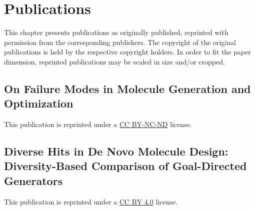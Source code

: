 \def\skippdf{1}

\chapter{Publications\label{chap:publications}}
This chapter presents publications as originally published, reprinted with permission
from the corresponding publishers. The copyright of the original publications is held
by the respective copyright holders. In order to fit the paper dimension, reprinted
publications may be scaled in size and/or cropped.

\clearpage
\thispagestyle{plain}
\section{On Failure Modes in Molecule Generation and Optimization\label{sec:failure-modes}}
This publication is reprinted under a \href{https://creativecommons.org/licenses/by-nc-nd/4.0/}{CC BY-NC-ND} license. 
\ifx\skippdf\undefined
    
    
\fi


\clearpage
\thispagestyle{plain}
\section{Diverse Hits in De Novo Molecule Design: Diversity-Based Comparison of Goal-Directed Generators\label{sec:diverse-hits}}
This publication is reprinted under a \href{https://creativecommons.org/licenses/by/4.0/}{CC BY 4.0} license. 

\ifx\skippdf\undefined
    

    
\fi



